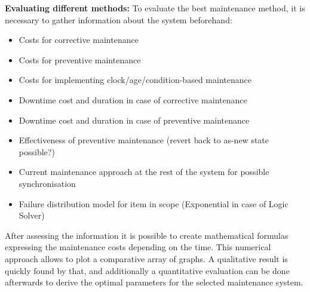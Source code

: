 \textbf{Evaluating different methods:}
To evaluate the best maintenance method, it is necessary to gather information about the system beforehand:

\begin{itemize}
\item Costs for corrective maintenance
\item Costs for preventive maintenance
\item Costs for implementing clock/age/condition-based maintenance
\item Downtime cost and duration in case of corrective maintenance
\item Downtime cost and duration in case of preventive maintenance
\item Effectiveness of preventive maintenance (revert back to as-new state possible?)
\item Current maintenance approach at the rest of the system for possible synchronisation
\item Failure distribution model for item in scope (Exponential in case of Logic Solver)
\end{itemize}

After assessing the information it is possible to create mathematical formulas expressing the maintenance costs depending on the time. This numerical approach allows to plot a comparative array of graphs. A qualitative result is quickly found by that, and additionally a quantitative evaluation can be done afterwards to derive the optimal parameters for the selected maintenance system.